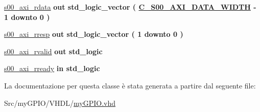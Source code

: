 \begin{DoxyCompactItemize}
\item 
\hypertarget{classmy_g_p_i_o_gad2655fadb987e0487c428aca187b55d0}{\hyperlink{group___a_x_i-device_gad2655fadb987e0487c428aca187b55d0}{s00\+\_\+axi\+\_\+rdata}  {\bfseries {\bfseries \textcolor{vhdlchar}{out}\textcolor{vhdlchar}{ }}} {\bfseries \textcolor{vhdlchar}{std\+\_\+logic\+\_\+vector}\textcolor{vhdlchar}{ }\textcolor{vhdlchar}{(}\textcolor{vhdlchar}{ }\textcolor{vhdlchar}{ }\textcolor{vhdlchar}{ }\textcolor{vhdlchar}{ }{\bfseries \hyperlink{group___a_x_i-device_gafce7943994a4ddfa81f224225976a4c7}{C\+\_\+\+S00\+\_\+\+A\+X\+I\+\_\+\+D\+A\+T\+A\+\_\+\+W\+I\+D\+T\+H}} \textcolor{vhdlchar}{-\/}\textcolor{vhdlchar}{ } \textcolor{vhdldigit}{1} \textcolor{vhdlchar}{ }\textcolor{vhdlchar}{downto}\textcolor{vhdlchar}{ }\textcolor{vhdlchar}{ } \textcolor{vhdldigit}{0} \textcolor{vhdlchar}{ }\textcolor{vhdlchar}{)}\textcolor{vhdlchar}{ }} }\label{classmy_g_p_i_o_gad2655fadb987e0487c428aca187b55d0}

\item 
\hypertarget{classmy_g_p_i_o_ga1acee955f50f71e5595a03c6ca301cf0}{\hyperlink{group___a_x_i-device_ga1acee955f50f71e5595a03c6ca301cf0}{s00\+\_\+axi\+\_\+rresp}  {\bfseries {\bfseries \textcolor{vhdlchar}{out}\textcolor{vhdlchar}{ }}} {\bfseries \textcolor{vhdlchar}{std\+\_\+logic\+\_\+vector}\textcolor{vhdlchar}{ }\textcolor{vhdlchar}{(}\textcolor{vhdlchar}{ }\textcolor{vhdlchar}{ } \textcolor{vhdldigit}{1} \textcolor{vhdlchar}{ }\textcolor{vhdlchar}{downto}\textcolor{vhdlchar}{ }\textcolor{vhdlchar}{ } \textcolor{vhdldigit}{0} \textcolor{vhdlchar}{ }\textcolor{vhdlchar}{)}\textcolor{vhdlchar}{ }} }\label{classmy_g_p_i_o_ga1acee955f50f71e5595a03c6ca301cf0}

\item 
\hypertarget{classmy_g_p_i_o_gaf180911f7eb262e530e26865bc97aa0b}{\hyperlink{group___a_x_i-device_gaf180911f7eb262e530e26865bc97aa0b}{s00\+\_\+axi\+\_\+rvalid}  {\bfseries {\bfseries \textcolor{vhdlchar}{out}\textcolor{vhdlchar}{ }}} {\bfseries \textcolor{vhdlchar}{std\+\_\+logic}\textcolor{vhdlchar}{ }} }\label{classmy_g_p_i_o_gaf180911f7eb262e530e26865bc97aa0b}

\item 
\hypertarget{classmy_g_p_i_o_ga8b82eb165d7024f6c7b25646f6ebdd4d}{\hyperlink{group___a_x_i-device_ga8b82eb165d7024f6c7b25646f6ebdd4d}{s00\+\_\+axi\+\_\+rready}  {\bfseries {\bfseries \textcolor{vhdlchar}{in}\textcolor{vhdlchar}{ }}} {\bfseries \textcolor{vhdlchar}{std\+\_\+logic}\textcolor{vhdlchar}{ }} }\label{classmy_g_p_i_o_ga8b82eb165d7024f6c7b25646f6ebdd4d}

\begin{DoxyCompactList}\small\item\em \end{DoxyCompactList}\end{DoxyCompactItemize}


La documentazione per questa classe è stata generata a partire dal seguente file\+:\begin{DoxyCompactItemize}
\item 
Src/my\+G\+P\+I\+O/\+V\+H\+D\+L/\hyperlink{my_g_p_i_o_8vhd}{my\+G\+P\+I\+O.\+vhd}\end{DoxyCompactItemize}
